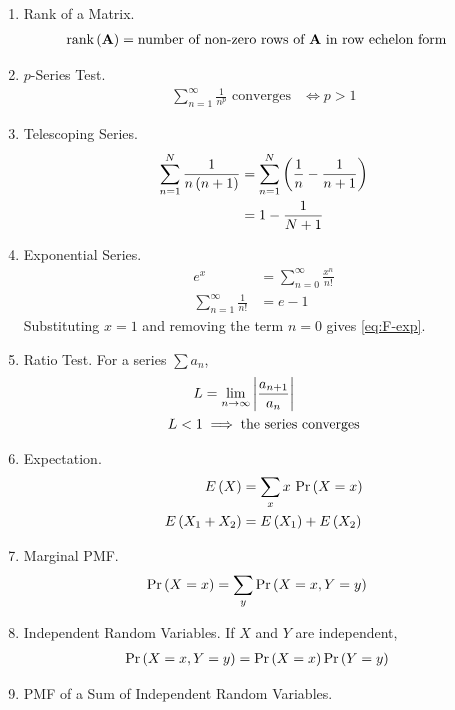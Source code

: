 \begin{enumerate}[label=\thesubsection.\arabic*, ref=\thesubsection.\theenumi]
\item Rank of a Matrix.
\begin{align}
\text{rank}\left(\mathbf{A}\right) &= \text{number of non-zero rows of } \mathbf{A} \text{ in row echelon form}
\label{eq:F-rank-pivots}
\end{align}
\item $p$-Series Test.
\begin{align}
\sum_{n=1}^{\infty} \frac{1}{n^{p}} \text{ converges} &\iff p > 1
\label{eq:F-pseries}
\end{align}
\item Telescoping Series.
\begin{align}
\sum_{n=1}^{N} \frac{1}{n\left(n+1\right)} &= \sum_{n=1}^{N} \left(\frac{1}{n} - \frac{1}{n+1}\right)
\\
&= 1 - \frac{1}{N+1}
\label{eq:F-telescope}
\end{align}
\item Exponential Series.
\begin{align}
e^x &= \sum_{n=0}^{\infty} \frac{x^n}{n!}
\\
\sum_{n=1}^{\infty} \frac{1}{n!} &= e - 1
\label{eq:F-exp}
\end{align}
\solution
Substituting $x = 1$ and removing the term $n = 0$ gives \eqref{eq:F-exp}.
\item Ratio Test. For a series $\sum a_n$,
\begin{align}
L &= \lim_{n \to \infty} \left\vert\frac{a_{n+1}}{a_n}\right\vert
\\
L < 1 &\implies \text{the series converges}
\label{eq:F-ratio}
\end{align}
\item Expectation.
\begin{align}
E\left(X\right) &= \sum_{x} x \, \Pr\left(X = x\right)
\\
E\left(X_1 + X_2\right) &= E\left(X_1\right) + E\left(X_2\right)
\label{eq:F-expect}
\end{align}
\item Marginal PMF.
\begin{align}
\Pr\left(X = x\right) &= \sum_{y} \Pr\left(X = x, Y = y\right)
\label{eq:F-marginal}
\end{align}
\item Independent Random Variables. If $X$ and $Y$ are independent,
\begin{align}
\Pr\left(X = x, Y = y\right) &= \Pr\left(X = x\right)\Pr\left(Y = y\right)
\label{eq:F-indep}
\end{align}
\item PMF of a Sum of Independent Random Variables.

\end{enumerate}
